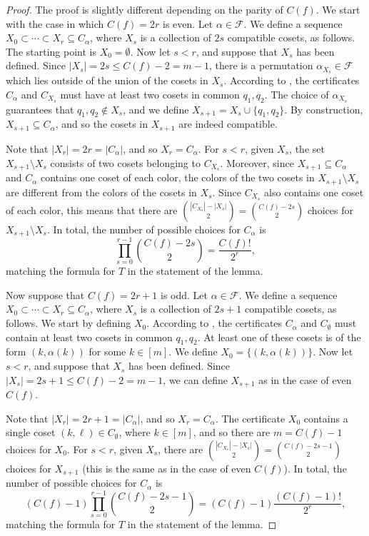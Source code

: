 \documentclass[10pt,a4paper]{amsart}
\theoremstyle{definition}
\begin{document}
\begin{proof}
The proof is slightly different depending on the parity of $C(f)$. We start with the case in which $C(f) = 2r$ is even. Let $\alpha \in \mathcal{F}$.
We define a sequence $X_0 \subset \cdots \subset X_r \subseteq C_\alpha$, where $X_s$ is a collection of $2s$ compatible cosets, as follows. The starting point is $X_0 = \emptyset$. Now let $s < r$, and suppose that $X_s$ has been defined.  Since $|X_s| = 2s \leq C(f) - 2 = m - 1$, there is a permutation $\alpha_{X_s} \in \mathcal{F}$ which lies outside of the union of the cosets in $X_s$. According to , the certificates $C_\alpha$ and $C_{X_s}$ must have at least two cosets in common $q_1,q_2$. The choice of $\alpha_{X_s}$ guarantees that $q_1,q_2 \notin X_s$, and we define $X_{s+1} = X_s \cup \{q_1,q_2\}$. By construction, $X_{s+1} \subseteq C_\alpha$, and so the cosets in $X_{s+1}$ are indeed compatible.

Note that $|X_r| = 2r = |C_\alpha|$, and so $X_r = C_\alpha$. For $s < r$, given $X_s$, the set $X_{s+1} \setminus X_s$ consists of two cosets belonging to $C_{X_s}$. Moreover, since $X_{s+1} \subseteq C_\alpha$ and $C_\alpha$ contains one coset of each color, the colors of the two cosets in $X_{s+1} \setminus X_s$ are different from the colors of the cosets in $X_s$. Since $C_{X_s}$ also contains one coset of each color, this means that there are $\binom{|C_{X_s}| - |X_s|}{2} = \binom{C(f) - 2s}{2}$ choices for $X_{s+1} \setminus X_s$. In total, the number of possible choices for $C_\alpha$ is
\[
 \prod_{s=0}^{r-1} \binom{C(f) - 2s}{2} =
 \frac{C(f)!}{2^r},
\]
matching the formula for $T$ in the statement of the lemma.

\smallskip

Now suppose that $C(f) = 2r+1$ is odd. Let $\alpha \in \mathcal{F}$. We define a sequence $X_0 \subset \cdots \subset X_r \subseteq C_\alpha$, where $X_s$ is a collection of $2s+1$ compatible cosets, as follows. We start by defining $X_0$. According to , the certificates $C_\alpha$ and $C_\emptyset$ must contain at least two cosets in common $q_1,q_2$. At least one of these cosets is of the form $(k,\alpha(k))$ for some $k \in [m]$. We define $X_0 = \{(k,\alpha(k))\}$. Now let $s < r$, and suppose that $X_s$ has been defined. Since $|X_s| = 2s+1 \leq C(f) - 2 = m - 1$, we can define $X_{s+1}$ as in the case of even $C(f)$.

Note that $|X_r| = 2r+1 = |C_\alpha|$, and so $X_r = C_\alpha$. The certificate $X_0$ contains a single coset $(k,\ell) \in C_\emptyset$, where $k \in [m]$, and so there are $m = C(f) - 1$ choices for $X_0$. For $s < r$, given $X_s$, there are $\binom{|C_{X_s}| - |X_s|}{2} = \binom{C(f) - 2s - 1}{2}$ choices for $X_{s+1}$ (this is the same as in the case of even $C(f)$). In total, the number of possible choices for $C_\alpha$ is
\[
 (C(f) - 1) \prod_{s=0}^{r-1} \binom{C(f) - 2s - 1}{2} =
 (C(f) - 1) \frac{(C(f) - 1)!}{2^r},
\]
matching the formula for $T$ in the statement of the lemma.
\end{proof}
\end{document}
